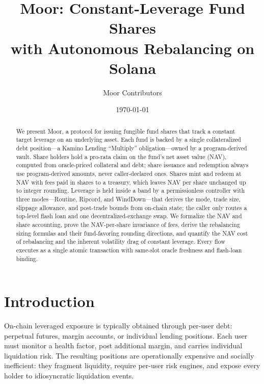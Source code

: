 \documentclass[11pt]{article}
\title{\textbf{Moor: Constant-Leverage Fund Shares\\ with Autonomous Rebalancing on Solana}}
\author{Moor Contributors}
\date{\today}
\theoremstyle{remark}
\begin{document}
\maketitle

\begin{abstract}
\noindent
We present Moor, a protocol for issuing fungible fund shares that track a constant target leverage on an underlying asset. Each fund is backed by a single collateralized debt position---a Kamino Lending ``Multiply'' obligation---owned by a program-derived vault. Share holders hold a pro-rata claim on the fund's net asset value (NAV), computed from oracle-priced collateral and debt; share issuance and redemption always use program-derived amounts, never caller-declared ones. Shares mint and redeem at NAV with fees paid in shares to a treasury, which leaves NAV per share unchanged up to integer rounding. Leverage is held inside a band by a permissionless controller with three modes---Routine, Ripcord, and WindDown---that derives the mode, trade size, slippage allowance, and post-trade bounds from on-chain state; the caller only routes a top-level flash loan and one decentralized-exchange swap. We formalize the NAV and share accounting, prove the NAV-per-share invariance of fees, derive the rebalancing sizing formulas and their fund-favoring rounding directions, and quantify the NAV cost of rebalancing and the inherent volatility drag of constant leverage. Every flow executes as a single atomic transaction with same-slot oracle freshness and flash-loan binding.
\end{abstract}

\section{Introduction}

On-chain leveraged exposure is typically obtained through per-user debt: perpetual futures, margin accounts, or individual lending positions. Each user must monitor a health factor, post additional margin, and carries individual liquidation risk. The resulting positions are operationally expensive and socially inefficient: they fragment liquidity, require per-user risk engines, and expose every holder to idiosyncratic liquidation events.
\end{document}
